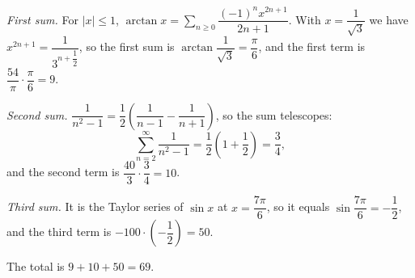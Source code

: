 \emph{First sum.} For $|x|\le1$, $\arctan x=\displaystyle\sum_{n\ge0}\dfrac{(-1)^nx^{2n+1}}{2n+1}$. With $x=\dfrac1{\sqrt3}$ we have $x^{2n+1}=\dfrac{1}{3^{n+\dfrac12}}$, so the first sum is $\arctan\dfrac1{\sqrt3}=\dfrac\pi6$, and the first term is $\dfrac{54}{\pi}\cdot\dfrac\pi6=9$.

\emph{Second sum.} $\dfrac{1}{n^2-1}=\dfrac12\left(\dfrac1{n-1}-\dfrac1{n+1}\right)$, so the sum telescopes:
\[\sum_{n=2}^{\infty}\dfrac{1}{n^2-1}=\dfrac12\left(1+\dfrac12\right)=\dfrac34,\]
and the second term is $\dfrac{40}{3}\cdot\dfrac34=10$.

\emph{Third sum.} It is the Taylor series of $\sin x$ at $x=\dfrac{7\pi}{6}$, so it equals $\sin\dfrac{7\pi}{6}=-\dfrac12$, and the third term is $-100\cdot\left(-\dfrac12\right)=50$.

The total is $9+10+50=\boxed{69}$.

